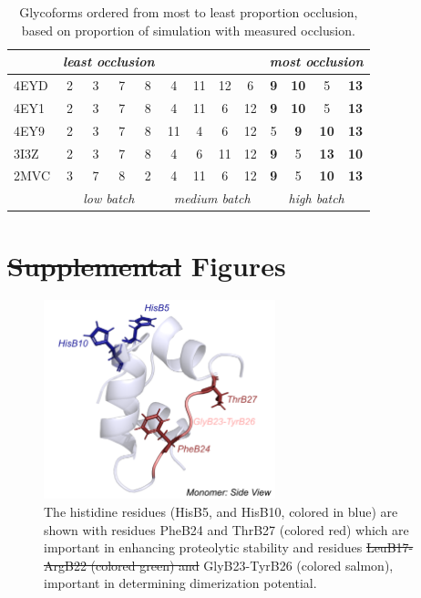 \documentclass[9pt]{elife}
\providecommand{\DIFaddtex}[1]{{\protect\color{blue}\uwave{#1}}} %
\providecommand{\DIFdeltex}[1]{{\protect\color{red}\sout{#1}}}                      %
\providecommand{\DIFaddbegin}{} %
\providecommand{\DIFaddend}{} %
\providecommand{\DIFdelbegin}{} %
\providecommand{\DIFdelend}{} %
\providecommand{\DIFdelFL}[1]{\DIFdel{#1}} %
\providecommand{\DIFdelbeginFL}{} %
\providecommand{\DIFdelendFL}{} %
\providecommand{\DIFadd}[1]{\texorpdfstring{\DIFaddtex{#1}}{#1}} %
\providecommand{\DIFdel}[1]{\texorpdfstring{\DIFdeltex{#1}}{}} %
\begin{document}
\renewcommand{\thetable}{S\arabic{table}}
\begin{table}[ht]
\centering
\begin{tabular} {|l| c c c c c c c c c c c c|}
    \hline
     & \multicolumn{4}{c}{\textit{least occlusion}} &&& & & \multicolumn{4}{c|}{\textit{most occlusion}}\\
    \hline     
    4EYD&2&3&7&8&4&11&12&6&\textbf{9}&\textbf{10}&5&\textbf{13}\\
    4EY1&2&3&7&8&4&11&6&12&\textbf{9}&\textbf{10}&5&\textbf{13}\\
    4EY9&2&3&7&8&11&4&6&12&5&\textbf{9}&\textbf{10}&\textbf{13}\\
    3I3Z&2&3&7&8&4&6&11&12&\textbf{9}&5&\textbf{13}&\textbf{10}\\
    2MVC&3&7&8&2&4&11&6&12&\textbf{9}&5&\textbf{10}&\textbf{13}\\
    \hline
    & \multicolumn{4}{c|}{\textit{low batch}} & \multicolumn{4}{c|}{\textit{medium batch}} & \multicolumn{4}{c|}{\textit{high batch}}\\
    \hline
\end{tabular}
\caption{Glycoforms ordered from most to least proportion occlusion, based on proportion of simulation with measured occlusion.}
\label{supple_tab: occlusion_tab}
\end{table}

\section{\DIFdelbegin \DIFdel{Supplemental }\DIFdelend \DIFaddbegin \DIFadd{Additional }\DIFaddend Figures}
\renewcommand{\thefigure}{S\arabic{figure}}
\DIFdelbegin %
\DIFdelend \begin{figure}[H]
\centering
\includegraphics[width=0.6\textwidth]{Figures/Fig_histidine_WT.png}
\caption{The histidine residues (HisB5, and HisB10, colored in blue) are shown with residues PheB24 and ThrB27 (colored red) which are important in enhancing proteolytic stability and residues \DIFdelbeginFL \DIFdelFL{LeuB17-ArgB22 (colored green) and }\DIFdelendFL GlyB23-TyrB26 (colored salmon), important in determining dimerization potential.}
\label{supple_fig: WT_hist}
\end{figure}
\end{document}
